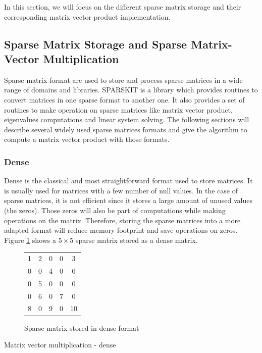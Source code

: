 In this section, we will focus on the different sparse matrix storage and their corresponding matrix vector product implementation.

\subsection{Sparse Matrix Storage and Sparse Matrix-Vector Multiplication}

Sparse matrix format are used to store and process sparse matrices in a wide range of domains and libraries.
SPARSKIT \cite{Saad1990} is a library which provides routines to convert matrices in one sparse format to another one.
It also provides a set of routines to make operation on sparse matrices like matrix vector product, eigenvalues computations and linear system solving.
The following sections will describe several widely used sparse matrices formats and give the algorithm to compute a matrix vector product with those formats.

\subsubsection{Dense}
Dense is the classical and most straightforward format used to store matrices.
It is usually used for matrices with a few number of null values.
In the case of sparse matrices, it is not efficient since it stores a large amount of unused values (the zeros).
Those zeros will also be part of computations while making operations on the matrix.
Therefore, storing the sparse matrices into a more adapted format will reduce memory footprint and save operations on zeros.
Figure \ref{fig:methods:dense_ex} shows a $5 \times 5$ sparse matrix stored as a dense matrix.

\begin{figure}
\centering
\begin{tabular}{|ccccc|}
\hline
1 & 2 & 0 & 0 & 3 \\
0 & 0 & 4 & 0 & 0 \\
0 & 5 & 0 & 0 & 0 \\
0 & 6 & 0 & 7 & 0 \\
8 & 0 & 9 & 0 & 10 \\
\hline
\end{tabular}
\caption{Sparse matrix stored in dense format \label{fig:methods:dense_ex}}
\end{figure}

\begin{algorithm}[h]
	\DontPrintSemicolon
	\caption{Matrix vector multiplication - dense\label{fig:methods:dense_algo}}
\end{algorithm}

